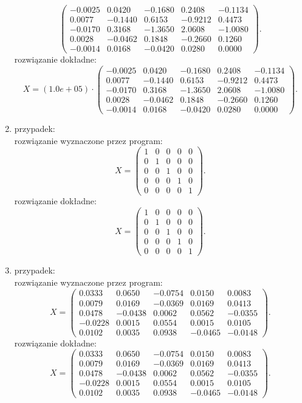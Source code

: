 \documentclass[12pt]{article}
\begin{document}
\begin{enumerate}
\[\begin{pmatrix}
-0.0025 & 0.0420 & -0.1680 & 0.2408 & -0.1134 \\
0.0077 & -0.1440 & 0.6153 & -0.9212 & 0.4473 \\
-0.0170 & 0.3168 & -1.3650 & 2.0608 & -1.0080 \\
0.0028 & -0.0462 & 0.1848 & -0.2660 & 0.1260 \\
-0.0014 & 0.0168 & -0.0420 & 0.0280 & 0.0000
\end{pmatrix}.
\]
rozwi\k{a}zanie dok\l{}adne:
\\
\[ 
X=\left(1.0e+05\right) \cdot \begin{pmatrix}
-0.0025 & 0.0420 & -0.1680 & 0.2408 & -0.1134 \\
0.0077 & -0.1440 & 0.6153 & -0.9212 & 0.4473 \\
-0.0170 & 0.3168 & -1.3650 & 2.0608 & -1.0080 \\
0.0028 & -0.0462 & 0.1848 & -0.2660 & 0.1260 \\
-0.0014 & 0.0168 & -0.0420 & 0.0280 & 0.0000
\end{pmatrix}.
\]
\item przypadek:
\\
rozwi\k{a}zanie wyznaczone przez program:
\[
X=\begin{pmatrix}
1 & 0 & 0 & 0 & 0 \\
0 & 1 & 0 & 0 & 0 \\
0 & 0 & 1 & 0 & 0 \\
0 & 0 & 0 & 1 & 0 \\
0 & 0 & 0 & 0 & 1
\end{pmatrix}.
\]
rozwi\k{a}zanie dok\l{}adne:
\[
X=\begin{pmatrix}
1 & 0 & 0 & 0 & 0 \\
0 & 1 & 0 & 0 & 0 \\
0 & 0 & 1 & 0 & 0 \\
0 & 0 & 0 & 1 & 0 \\
0 & 0 & 0 & 0 & 1
\end{pmatrix}.
\]
\item przypadek:
\\
rozwi\k{a}zanie wyznaczone przez program:
\[
X=\begin{pmatrix}
0.0333 & 0.0650 & -0.0754 & 0.0150 & 0.0083 \\
0.0079 & 0.0169 & -0.0369 & 0.0169 & 0.0413 \\
0.0478 & -0.0438 & 0.0062 & 0.0562 & -0.0355 \\
-0.0228 & 0.0015 & 0.0554 & 0.0015 & 0.0105 \\
0.0102 & 0.0035 & 0.0938 & -0.0465 & -0.0148
\end{pmatrix}.
\]
rozwi\k{a}zanie dok\l{}adne:
\[
X=\begin{pmatrix}
0.0333 & 0.0650 & -0.0754 & 0.0150 & 0.0083 \\
0.0079 & 0.0169 & -0.0369 & 0.0169 & 0.0413 \\
0.0478 & -0.0438 & 0.0062 & 0.0562 & -0.0355 \\
-0.0228 & 0.0015 & 0.0554 & 0.0015 & 0.0105 \\
0.0102 & 0.0035 & 0.0938 & -0.0465 & -0.0148
\end{pmatrix}.
\]

\end{enumerate}
\end{document}
